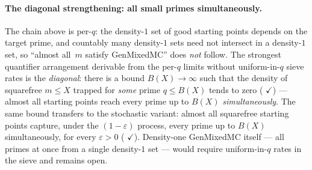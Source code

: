 \paragraph{The diagonal strengthening: all small primes simultaneously.}
The chain above is per-$q$: the density-$1$ set of good starting
points depends on the target prime, and countably many density-$1$
sets need not intersect in a density-$1$ set, so ``almost all~$m$
satisfy GenMixedMC'' does \emph{not} follow.  The strongest
quantifier arrangement derivable from the per-$q$ limits without
uniform-in-$q$ sieve rates is the \emph{diagonal}: there is a bound
$B(X) \to \infty$ such that the density of squarefree $m \leq X$
trapped for \emph{some} prime $q \leq B(X)$ tends to zero
(
{\color{leanink}$\checkmark$}) --- almost all starting points reach
every prime up to $B(X)$ \emph{simultaneously}.  The same bound
transfers to the stochastic variant: almost all squarefree starting
points capture, under the $(1{-}\varepsilon)$ process, every prime up
to $B(X)$ simultaneously, for every $\varepsilon > 0$
(
{\color{leanink}$\checkmark$}).  Density-one GenMixedMC itself ---
all primes at once from a single density-$1$ set --- would require
uniform-in-$q$ rates in the sieve and remains open.

